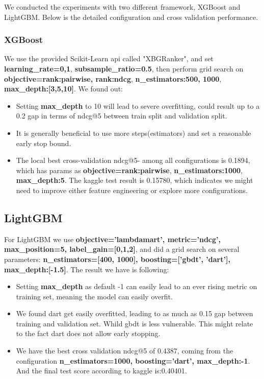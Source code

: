 \documentclass[runningheads]{llncs}
\begin{document}
We conducted the experiments with two different framework, XGBoost and LightGBM. Below is the detailed configuration and cross validation performance.

\subsubsection{XGBoost}
We use the provided Scikit-Learn api called "XBGRanker", and set \textbf{learning\_rate=0,1}, \textbf{subsample\_ratio=0.5}, then perform grid search on \textbf{objective={rank:pairwise, rank:ndcg}}, \textbf{n\_estimators:{500, 1000}}, \textbf{max\_depth:[3,5,10]}.
We found out:
\begin{itemize}
    \item Setting \textbf{max\_depth} to 10 will lead to severe overfitting, could result up to a 0.2 gap in terms of ndcg@5 between train split and validation split.
    \item It is generally beneficial to use more steps(estimators) and set a reasonable early stop bound.
    \item The local best cross-validation ndcg@5- among all configurations is 0.1894, which has params as \textbf{objective=rank:pairwise}, \textbf{n\_estimators:1000}, \textbf{max\_depth:5}. The kaggle test result is 0.15780, which indicates we might need to improve either feature engineering or explore more configurations.
\end{itemize}

\subsection{LightGBM}

For LightGBM we use \textbf{objective='lambdamart', metric='ndcg', max\_position=5, label\_gain=[0,1,2]}, and did a grid search on several parameters: \textbf{n\_estimators=[400, 1000], boosting=['gbdt', 'dart'], max\_depth:[-1.5]}.
The result we have is following:
\begin{itemize}
    \item Setting \textbf{max\_depth} as default -1 can easily lead to an ever rising metric on training set, meaning the model can easily overfit.
    \item We found dart get easily overfitted, leading to as much as 0.15 gap between training and validation set. Whild gbdt is less vulnerable. This might relate to the fact dart does not allow early stopping.
    \item We have the best cross validation ndcg@5 of 0.4387, coming from the configuration \textbf{n\_estimators=1000, boosting='dart', max\_depth:-1}. And the final test score according to kaggle is:0.40401.
\end{itemize}
\end{document}
